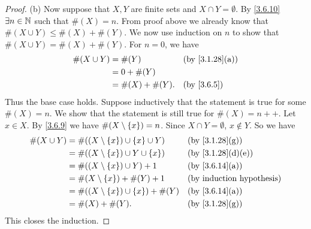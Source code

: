 \begin{proof}{(b)}
	Now suppose that \(X, Y\) are finite sets and \(X \cap Y = \emptyset\).
	By \cref{3.6.10} \(\exists n \in \mathbb{N}\) such that \(\#(X) = n\).
	From proof above we already know that \(\#(X \cup Y) \leq \#(X) + \#(Y)\).
	We now use induction on \(n\) to show that \(\#(X \cup Y) = \#(X) + \#(Y)\).
	For \(n = 0\), we have
	\begin{align*}
		\#(X \cup Y) & = \#(Y)          &  & \text{(by \cref{3.1.28}(a))} \\
		             & = 0 + \#(Y)                                        \\
		             & = \#(X) + \#(Y). &  & \by{3.6.5}
	\end{align*}
	Thus the base case holds.
	Suppose inductively that the statement is true for some \(\#(X) = n\).
	We show that the statement is still true for \(\#(X) = n++\).
	Let \(x \in X\).
	By \cref{3.6.9} we have \(\#(X \setminus \left\lbrace x\right\rbrace) = n\).
	Since \(X \cap Y = \emptyset\), \(x \notin Y\).
	So we have
	\begin{align*}
		\#(X \cup Y) & = \#((X \setminus \set{x}) \cup \set{x} \cup Y)  &  & \text{(by \cref{3.1.28}(g))}    \\
		             & = \#((X \setminus \set{x}) \cup Y \cup \set{x})  &  & \text{(by \cref{3.1.28}(d)(e))} \\
		             & = \#((X \setminus \set{x}) \cup Y) + 1           &  & \text{(by \cref{3.6.14}(a))}    \\
		             & = \#(X \setminus \set{x}) + \#(Y) + 1            &  & \byIH                           \\
		             & = \#((X \setminus \set{x}) \cup \set{x}) + \#(Y) &  & \text{(by \cref{3.6.14}(a))}    \\
		             & = \#(X) + \#(Y).                                 &  & \text{(by \cref{3.1.28}(g))}
	\end{align*}
	This closes the induction.
\end{proof}

